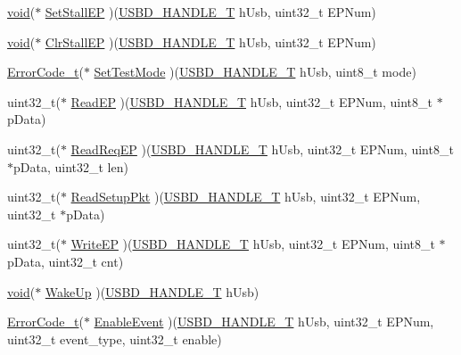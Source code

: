 \begin{DoxyCompactItemize}
\item 
\hyperlink{Paradigm_2Tern__EE_2small_2portmacro_8h_a14d32f8130d3c0b212cfc751730b5b49}{void}($\ast$ \hyperlink{structUSBD__HW__API_a320c4cb40c872179e8a53e3ab028e1c2}{Set\-Stall\-E\-P} )(\hyperlink{group__USBD__Core_gafdbb2204d929cb9d75736bd2b42342ac}{U\-S\-B\-D\-\_\-\-H\-A\-N\-D\-L\-E\-\_\-\-T} h\-Usb, uint32\-\_\-t E\-P\-Num)
\item 
\hyperlink{Paradigm_2Tern__EE_2small_2portmacro_8h_a14d32f8130d3c0b212cfc751730b5b49}{void}($\ast$ \hyperlink{structUSBD__HW__API_a72e54621b0cb3e82ac1cc1595d9a1067}{Clr\-Stall\-E\-P} )(\hyperlink{group__USBD__Core_gafdbb2204d929cb9d75736bd2b42342ac}{U\-S\-B\-D\-\_\-\-H\-A\-N\-D\-L\-E\-\_\-\-T} h\-Usb, uint32\-\_\-t E\-P\-Num)
\item 
\hyperlink{error_8h_a905255056c349318139d94aa4523d516}{Error\-Code\-\_\-t}($\ast$ \hyperlink{structUSBD__HW__API_a09ee889ca9547f99112dd8d0655f7e7b}{Set\-Test\-Mode} )(\hyperlink{group__USBD__Core_gafdbb2204d929cb9d75736bd2b42342ac}{U\-S\-B\-D\-\_\-\-H\-A\-N\-D\-L\-E\-\_\-\-T} h\-Usb, uint8\-\_\-t mode)
\item 
uint32\-\_\-t($\ast$ \hyperlink{structUSBD__HW__API_a637042da839963e43c354ea184582080}{Read\-E\-P} )(\hyperlink{group__USBD__Core_gafdbb2204d929cb9d75736bd2b42342ac}{U\-S\-B\-D\-\_\-\-H\-A\-N\-D\-L\-E\-\_\-\-T} h\-Usb, uint32\-\_\-t E\-P\-Num, uint8\-\_\-t $\ast$p\-Data)
\item 
uint32\-\_\-t($\ast$ \hyperlink{structUSBD__HW__API_a24326b43822367a3c7ce46ffe70c7087}{Read\-Req\-E\-P} )(\hyperlink{group__USBD__Core_gafdbb2204d929cb9d75736bd2b42342ac}{U\-S\-B\-D\-\_\-\-H\-A\-N\-D\-L\-E\-\_\-\-T} h\-Usb, uint32\-\_\-t E\-P\-Num, uint8\-\_\-t $\ast$p\-Data, uint32\-\_\-t len)
\item 
uint32\-\_\-t($\ast$ \hyperlink{structUSBD__HW__API_ae8e43fb5e3029186b858971203735064}{Read\-Setup\-Pkt} )(\hyperlink{group__USBD__Core_gafdbb2204d929cb9d75736bd2b42342ac}{U\-S\-B\-D\-\_\-\-H\-A\-N\-D\-L\-E\-\_\-\-T} h\-Usb, uint32\-\_\-t E\-P\-Num, uint32\-\_\-t $\ast$p\-Data)
\item 
uint32\-\_\-t($\ast$ \hyperlink{structUSBD__HW__API_a6565f11d655f825d13c9d197925fd1cb}{Write\-E\-P} )(\hyperlink{group__USBD__Core_gafdbb2204d929cb9d75736bd2b42342ac}{U\-S\-B\-D\-\_\-\-H\-A\-N\-D\-L\-E\-\_\-\-T} h\-Usb, uint32\-\_\-t E\-P\-Num, uint8\-\_\-t $\ast$p\-Data, uint32\-\_\-t cnt)
\item 
\hyperlink{Paradigm_2Tern__EE_2small_2portmacro_8h_a14d32f8130d3c0b212cfc751730b5b49}{void}($\ast$ \hyperlink{structUSBD__HW__API_aaf44f0d6be8e7e49782addd889cc7b98}{Wake\-Up} )(\hyperlink{group__USBD__Core_gafdbb2204d929cb9d75736bd2b42342ac}{U\-S\-B\-D\-\_\-\-H\-A\-N\-D\-L\-E\-\_\-\-T} h\-Usb)
\item 
\hyperlink{error_8h_a905255056c349318139d94aa4523d516}{Error\-Code\-\_\-t}($\ast$ \hyperlink{structUSBD__HW__API_a8556c919546438e9ca184c460cd1daa9}{Enable\-Event} )(\hyperlink{group__USBD__Core_gafdbb2204d929cb9d75736bd2b42342ac}{U\-S\-B\-D\-\_\-\-H\-A\-N\-D\-L\-E\-\_\-\-T} h\-Usb, uint32\-\_\-t E\-P\-Num, uint32\-\_\-t event\-\_\-type, uint32\-\_\-t enable)
\end{DoxyCompactItemize}


